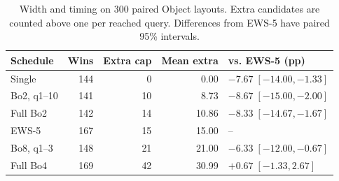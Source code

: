 \begin{table}[t]\centering\small
\caption{Width and timing on 300 paired Object layouts. Extra candidates are counted above one per reached query. Differences from EWS-5 have paired 95\% intervals.}
\label{tab:width-time}
\begin{tabular}{@{}lrrrl@{}}\toprule
Schedule & Wins & Extra cap & Mean extra & vs. EWS-5 (pp) \\
\midrule
Single & 144 & 0 & 0.00 & $-7.67\;[-14.00, -1.33]$ \\
Bo2, q1--10 & 141 & 10 & 8.73 & $-8.67\;[-15.00, -2.00]$ \\
Full Bo2 & 142 & 14 & 10.86 & $-8.33\;[-14.67, -1.67]$ \\
EWS-5 & 167 & 15 & 15.00 & -- \\
Bo8, q1--3 & 148 & 21 & 21.00 & $-6.33\;[-12.00, -0.67]$ \\
Full Bo4 & 169 & 42 & 30.99 & $+0.67\;[-1.33, 2.67]$ \\
\bottomrule\end{tabular}
\end{table}
